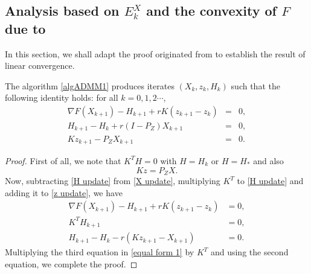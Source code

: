 
\subsection{Analysis based on $E_k^X$ and the convexity of $F$ due to \cite{shi2014linear}} 
In this section, we shall adapt the proof originated from \cite{shi2014linear} to establish the result of linear convergence.
\begin{lemma} 
The algorithm \ref{algADMM1} produces iterates $(X_k,z_k,H_k)$ such that the following identity holds: for all $k=0,1,2\cdots$, 
\begin{eqnarray*}\label{equal form 2}
\nabla F(X_{k+1}) - H_{k+1} + r K(z_{k+1} - z_{k}) &=& 0, \\
H_{k+1} - H_{k} + r \left( I - P_Z \right) X_{k+1} &=& 0,\\
K z_{k+1} - P_Z X_{k+1} &=& 0.
\end{eqnarray*}
\end{lemma} 
\begin{proof} 
First of all, we note that $K^TH = 0$ with $H = H_k$ or $H = H_*$ and also 
\begin{equation}
Kz = P_Z X. 
\end{equation}
Now, subtracting \eqref{H update} from \eqref{X update}, multiplying $K^T$ to \eqref{H update} and adding it to \eqref{z update}, we have
\begin{equation}\label{equal form 1}
    \begin{split}
        \nabla F(X_{k+1}) - H_{k+1} + r K(z_{k+1} - z_{k}) &= 0, \\
        K^T H_{k+1} &= 0, \\
        H_{k+1} - H_{k}  - r (K z_{k+1} - X_{k+1}) &= 0. 
    \end{split}
\end{equation}
Multiplying the third equation in \eqref{equal form 1} by $K^T$ and using the second equation, we complete the proof. 
\end{proof}





